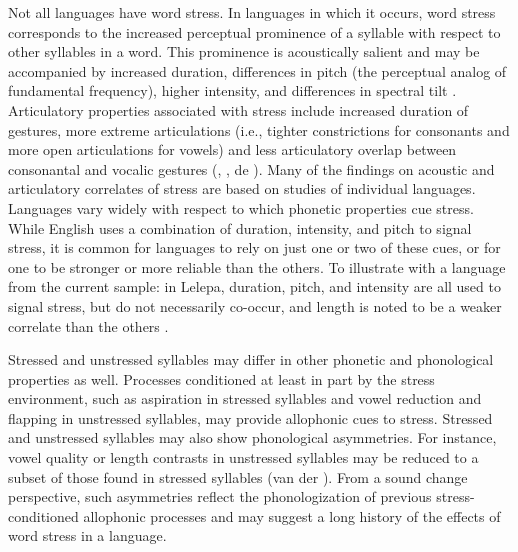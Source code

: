   Not all languages have word stress. In languages in which it occurs, word stress corresponds to the increased perceptual prominence of a syllable with respect to other syllables in a word. This prominence is acoustically salient and may be accompanied by increased duration, differences in pitch (the perceptual analog of fundamental frequency), higher intensity, and differences in spectral tilt \citep{Gordon2011}. Articulatory properties associated with stress include increased duration of gestures, more extreme articulations (i.e., tighter constrictions for consonants and more open articulations for vowels) and less articulatory overlap between consonantal and vocalic gestures (\citealt{BeckmanEdwards1994}, \citealt{Fougeron1999}, de \citealt{JongEtAl1993}). Many of the findings on acoustic and articulatory correlates of stress are based on studies of individual languages. Languages vary widely with respect to which phonetic properties cue stress. While English uses a combination of duration, intensity, and pitch to signal stress, it is common for languages to rely on just one or two of these cues, or for one to be stronger or more reliable than the others. To illustrate with a language from the current sample: in Lelepa, duration, pitch, and intensity are all used to signal stress, but do not necessarily co-occur, and length is noted to be a weaker correlate than the others \citep[58]{Lacrampe2014}.

  Stressed and unstressed syllables may differ in other phonetic and phonological properties as well. Processes conditioned at least in part by the stress environment, such as aspiration in stressed syllables and vowel reduction and flapping in unstressed syllables, may provide allophonic cues to stress. Stressed and unstressed syllables may also show phonological asymmetries. For instance, vowel quality or length contrasts in unstressed syllables may be reduced to a subset of those found in stressed syllables (van der \citealt{Hulst2010}). From a sound change perspective, such asymmetries reflect the phonologization of previous stress-conditioned allophonic processes and may suggest a long history of the effects of word stress in a language.

